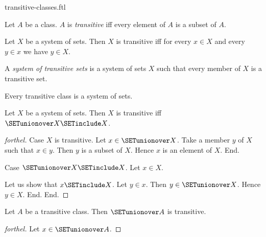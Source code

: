 \documentclass{naproche-library}
\begin{document}
\begin{smodule}[title=Transitive Classes]{transitive-classes.ftl}

\begin{definition}[forthel,id=SET_THEORY_01_8167915266244608]
  Let $A$ be a class.
  $A$ is \emph{transitive} iff every element of $A$ is a subset of $A$.
\end{definition}

\begin{proposition}[forthel,id=SET_THEORY_01_6964770955591680]
  Let $X$ be a system of sets.
  Then $X$ is transitive iff for every $x \in X$ and every $y \in x$ we have $y \in X$.
\end{proposition}

\begin{definition}[forthel,id=SET_THEORY_01_4219967964708864]
  A \emph{system of transitive sets} is a system of sets $X$ such that every member of $X$ is a transitive set.
\end{definition}

\begin{proposition}[forthel,id=SET_THEORY_01_2095807333400576]
  Every transitive class is a system of sets.
\end{proposition}

\begin{proposition}[forthel,id=SET_THEORY_01_6524117649981440]
  Let $X$ be a system of sets.
  Then $X$ is transitive iff $\SETunionover X \SETinclude X$.
\end{proposition}
\begin{proof}[forthel]
  Case $X$ is transitive.
    Let $x \in \SETunionover X$.
    Take a member $y$ of $X$ such that $x \in y$.
    Then $y$ is a subset of $X$.
    Hence $x$ is an element of $X$.
  End.

  Case $\SETunionover X \SETinclude X$.
    Let $x \in X$.

    Let us show that $x \SETinclude X$.
      Let $y \in x$.
      Then $y \in \SETunionover X$.
      Hence $y \in X$.
    End.
  End.
\end{proof}

\begin{proposition}[forthel,id=SET_THEORY_01_620651482185728]
  Let $A$ be a transitive class.
  Then $\SETunionover A$ is transitive.
\end{proposition}
\begin{proof}[forthel]
  Let $x \in \SETunionover A$.


\end{proof}
\end{smodule}
\end{document}
